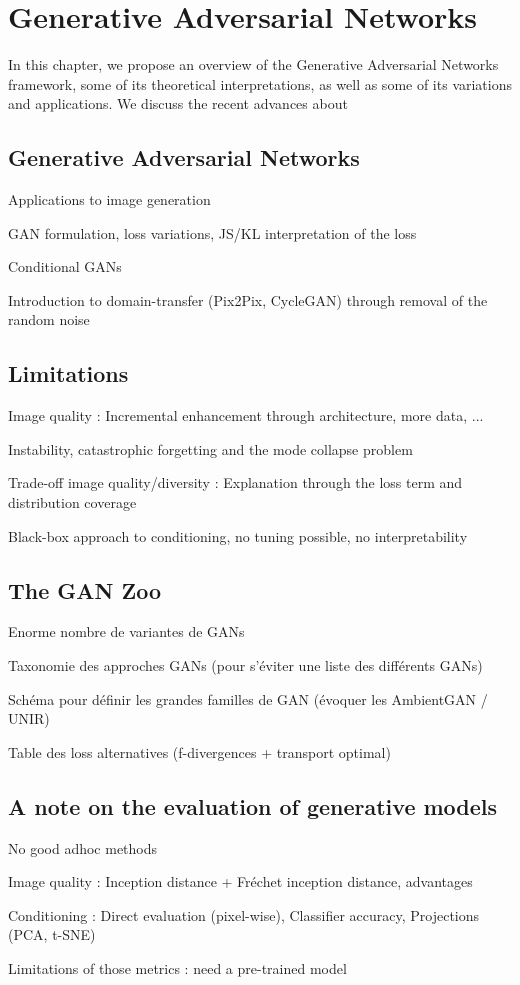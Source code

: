 \chapter{Generative Adversarial Networks}
\label{chap:chapter1}

\begin{chapterabstract}
	In this chapter, we propose an overview	 of the Generative Adversarial Networks \cite{Goodfellow2014} framework, some of its theoretical interpretations, as well as some of its variations and applications. We discuss the recent advances about 
\end{chapterabstract}

\section{Generative Adversarial Networks}
Applications to image generation

GAN formulation, loss variations, JS/KL interpretation of the loss

Conditional GANs

Introduction to domain-transfer (Pix2Pix, CycleGAN) through removal of the random noise

\section{Limitations}
Image quality : Incremental enhancement through architecture, more data, ... 

Instability, catastrophic forgetting and the mode collapse problem

Trade-off image quality/diversity : Explanation through the loss term and distribution coverage

Black-box approach to conditioning, no tuning possible, no interpretability

\section{The GAN Zoo}

Enorme nombre de variantes de GANs

Taxonomie des approches GANs (pour s'éviter une liste des différents GANs)

Schéma pour définir les grandes familles de GAN (évoquer les AmbientGAN / UNIR)

Table des loss alternatives (f-divergences + transport optimal)


\section{A note on the  evaluation of generative models}

No good adhoc methods

Image quality : Inception distance + Fréchet inception distance, advantages

Conditioning : Direct evaluation (pixel-wise), Classifier accuracy, Projections (PCA, t-SNE)

Limitations of those metrics : need a pre-trained model


